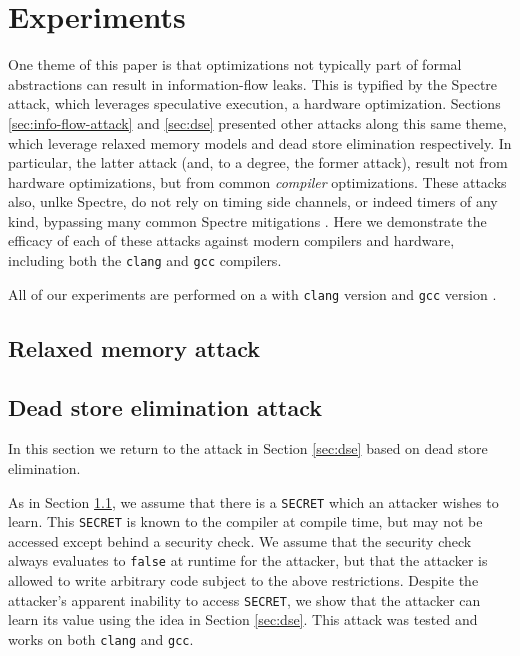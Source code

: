 \section{Experiments}
\label{sec:experiments}

One theme of this paper is that optimizations not typically part of formal
abstractions can result in information-flow leaks.
This is typified by the Spectre attack, which leverages speculative execution,
a hardware optimization.
Sections \ref{sec:info-flow-attack} and \ref{sec:dse} presented other attacks
along this same theme, which leverage relaxed memory models and dead store
elimination respectively.
In particular, the latter attack (and, to a degree, the former attack), result
not from hardware optimizations, but from common \emph{compiler} optimizations.
These attacks also, unlke Spectre, do not rely on timing side channels, or
indeed timers of any kind, bypassing many common Spectre mitigations
\cite{TODO}.
Here we demonstrate the efficacy of each of these attacks against modern
compilers and hardware, including both the \verb|clang| and \verb|gcc|
compilers.

All of our experiments are performed on a  with
\verb|clang| version  and \verb|gcc| version .

\subsection{Relaxed memory attack}
\label{subsec:exp-rel-mem}

\subsection{Dead store elimination attack}
In this section we return to the attack in Section \ref{sec:dse} based on
dead store elimination.

As in Section \ref{subsec:exp-rel-mem}, we assume that there is a
\verb|SECRET| which an attacker wishes to learn.
This \verb|SECRET| is known to the compiler at compile time, but may not be
accessed except behind a security check.
We assume that the security check always evaluates to \verb|false| at runtime
for the attacker, but that the attacker is allowed to write arbitrary code
subject to the above restrictions.
Despite the attacker's apparent inability to access \verb|SECRET|, we show
that the attacker can learn its value using the idea in Section \ref{sec:dse}.
This attack was tested and works on both \verb|clang| and \verb|gcc|.

